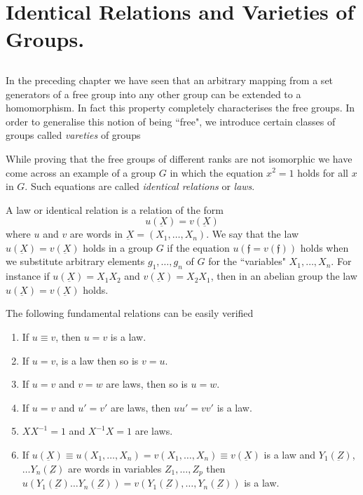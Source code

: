 \chapter{Identical Relations and Varieties of Groups.} %

\section{} %

In the preceding chapter we have seen that an arbitrary mapping from a
set generators of a free group into any other group can be extended to
a homomorphism. In fact this property completely characterises the
free groups. In order to generalise this notion of being ``free", we
introduce certain classes of groups called \textit{vareties} of groups  

While proving that the free groups of different ranks are not
isomorphic we have come across an example of a group $G$ in which the
equation $x^2 =1$ holds for all $x$ in $G$. Such equations are called
\textit{identical relations} or \textit{laws}. 
\begin{definition}
  A law or identical relation is a relation of the form
  $$
  u (\underbar{X}) = v(\underbar{X})
  $$
  where $u$ and $v$ are words in $\underbar{X} = (X_1, \ldots, 
  X_n)$. We say that the law $u (\underbar{X}) = v(\underbar{X})$
  holds in a group $G$ if the equation $u (\mathfrak{f} =
  v(\mathfrak{f}))$ holds when we substitute arbitrary elements $g_1,
  \ldots,  g_n$ of $G$ for the ``variables" $X_1, \ldots,  X_n$. For
  instance if $u(\underbar{X}) = X_1 X_2$ and $v (\underbar{X})= X_2
  X_1$, then in an abelian group the law $u (\underbar{X}) =
  v(\underbar{X})$ holds.  
  
  The following fundamental relations can be easily verified 
  \begin{enumerate}[\rm (1)]
  \item If $u \equiv v$, then $u = v$ is a law.
  \item If $u = v$, is a law then so is $v= u$.
  \item If $u = v$ and $v = w$ are laws, then so is $u = w$.
  \item If $u = v$ and $u' = v'$ are laws, then $uu' = vv'$ is a law.
  \item $XX^{-1} = 1$ and $X^{-1}X =1$ are laws.
  \item If $u (\underbar{X}) \equiv u (X_1, \ldots,  X_n) = v(X_1,
    \ldots,  X_n) \equiv v(\underbar{X}) $ is a law and $Y_1
    (\underbar{Z})$, $\ldots Y_n (\underbar{Z})$ are words in variables
    $Z_1, \ldots,  Z_p$ then $u (Y_1(\underbar{Z}) \ldots Y_n
    (\underbar{Z})) = v (Y_1(\underbar{Z}), \ldots,  Y_n
    (\underbar{Z}) )$ is a law. 
  \end{enumerate}
\end{definition}

